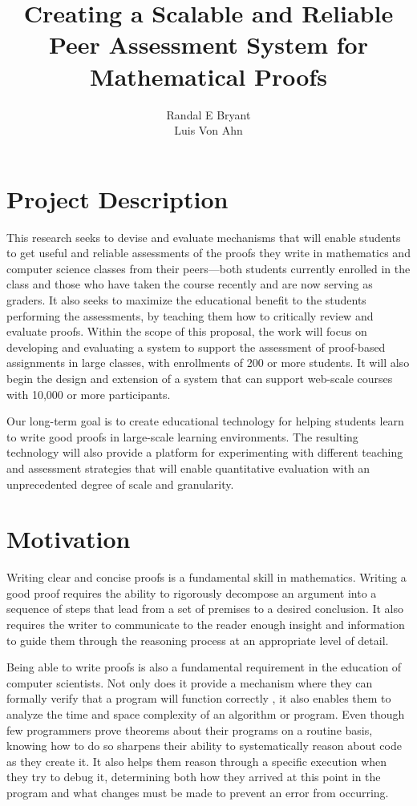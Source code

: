 \documentclass[12pt]{article}
\title{Creating a Scalable and Reliable Peer Assessment System for
  Mathematical Proofs}
\author{Randal E Bryant \\ Luis Von Ahn}
\begin{document}
\section*{Project Description}

This research seeks to devise and evaluate mechanisms that will enable
students to get useful and reliable assessments of the proofs they
write in mathematics and computer science classes from their
peers---both students currently enrolled in the class and those who
have taken the course recently and are now serving as graders.  It
also seeks to maximize the educational benefit to the students
performing the assessments, by teaching them how to critically review
and evaluate proofs.  Within the scope of this proposal, the work will
focus on developing and evaluating a system to support the assessment
of proof-based assignments in large classes, with enrollments of 200
or more students.  It will also begin the design and extension of a
system that can support web-scale courses with 10,000 or more
participants.

Our long-term goal is to create educational technology for helping
students learn to write good proofs in large-scale learning
environments.  The resulting technology will also provide a platform
for experimenting with different teaching and assessment strategies
that will enable quantitative evaluation with an unprecedented
degree of scale and granularity.

\section{Motivation}

Writing clear and concise proofs is a fundamental skill
in mathematics.  Writing a good proof requires the ability to
rigorously decompose an argument into a sequence of steps that lead
from a set of premises to
a desired conclusion.  It also requires the
writer to communicate to the reader enough insight and information to guide them
through the reasoning process at an appropriate level of detail.

Being able to write proofs is also a fundamental requirement in the
education of computer scientists.  Not only does it provide a
mechanism where they can formally verify that a program will function
correctly \citep{hoare-cacm69}, it also enables them to analyze the
time and space complexity of an algorithm or program.  Even though few
programmers prove theorems about their programs on a routine basis,
knowing how to do so sharpens their ability to systematically reason
about code as they create it.  It also helps them reason through a
specific execution when they try to debug it, determining both how
they arrived at this point in the program and what changes must be
made to prevent an error from occurring.
\end{document}

